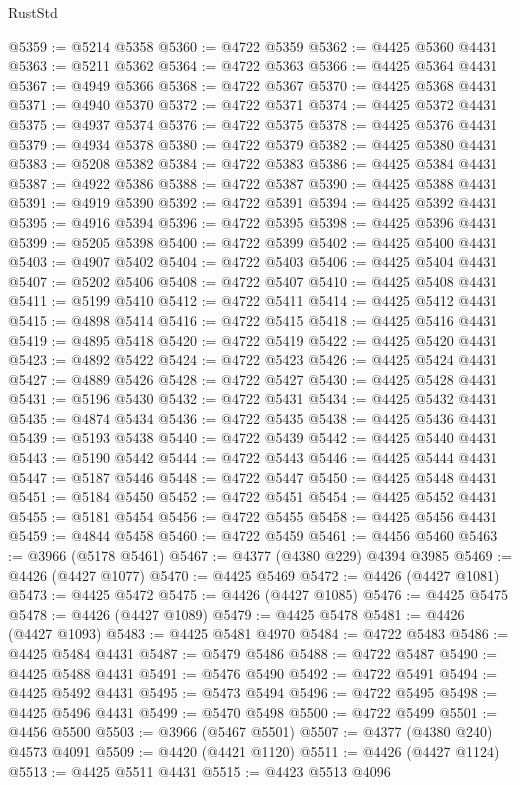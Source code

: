 \begin{lexlean}{RustStd}
\begin{coremodule}
@5359 := @5214 @5358
@5360 := @4722 @5359
@5362 := @4425 @5360 @4431
@5363 := @5211 @5362
@5364 := @4722 @5363
@5366 := @4425 @5364 @4431
@5367 := @4949 @5366
@5368 := @4722 @5367
@5370 := @4425 @5368 @4431
@5371 := @4940 @5370
@5372 := @4722 @5371
@5374 := @4425 @5372 @4431
@5375 := @4937 @5374
@5376 := @4722 @5375
@5378 := @4425 @5376 @4431
@5379 := @4934 @5378
@5380 := @4722 @5379
@5382 := @4425 @5380 @4431
@5383 := @5208 @5382
@5384 := @4722 @5383
@5386 := @4425 @5384 @4431
@5387 := @4922 @5386
@5388 := @4722 @5387
@5390 := @4425 @5388 @4431
@5391 := @4919 @5390
@5392 := @4722 @5391
@5394 := @4425 @5392 @4431
@5395 := @4916 @5394
@5396 := @4722 @5395
@5398 := @4425 @5396 @4431
@5399 := @5205 @5398
@5400 := @4722 @5399
@5402 := @4425 @5400 @4431
@5403 := @4907 @5402
@5404 := @4722 @5403
@5406 := @4425 @5404 @4431
@5407 := @5202 @5406
@5408 := @4722 @5407
@5410 := @4425 @5408 @4431
@5411 := @5199 @5410
@5412 := @4722 @5411
@5414 := @4425 @5412 @4431
@5415 := @4898 @5414
@5416 := @4722 @5415
@5418 := @4425 @5416 @4431
@5419 := @4895 @5418
@5420 := @4722 @5419
@5422 := @4425 @5420 @4431
@5423 := @4892 @5422
@5424 := @4722 @5423
@5426 := @4425 @5424 @4431
@5427 := @4889 @5426
@5428 := @4722 @5427
@5430 := @4425 @5428 @4431
@5431 := @5196 @5430
@5432 := @4722 @5431
@5434 := @4425 @5432 @4431
@5435 := @4874 @5434
@5436 := @4722 @5435
@5438 := @4425 @5436 @4431
@5439 := @5193 @5438
@5440 := @4722 @5439
@5442 := @4425 @5440 @4431
@5443 := @5190 @5442
@5444 := @4722 @5443
@5446 := @4425 @5444 @4431
@5447 := @5187 @5446
@5448 := @4722 @5447
@5450 := @4425 @5448 @4431
@5451 := @5184 @5450
@5452 := @4722 @5451
@5454 := @4425 @5452 @4431
@5455 := @5181 @5454
@5456 := @4722 @5455
@5458 := @4425 @5456 @4431
@5459 := @4844 @5458
@5460 := @4722 @5459
@5461 := @4456 @5460
@5463 := @3966 (@5178 @5461)
@5467 := @4377 (@4380 @229) @4394 @3985
@5469 := @4426 (@4427 @1077)
@5470 := @4425 @5469
@5472 := @4426 (@4427 @1081)
@5473 := @4425 @5472
@5475 := @4426 (@4427 @1085)
@5476 := @4425 @5475
@5478 := @4426 (@4427 @1089)
@5479 := @4425 @5478
@5481 := @4426 (@4427 @1093)
@5483 := @4425 @5481 @4970
@5484 := @4722 @5483
@5486 := @4425 @5484 @4431
@5487 := @5479 @5486
@5488 := @4722 @5487
@5490 := @4425 @5488 @4431
@5491 := @5476 @5490
@5492 := @4722 @5491
@5494 := @4425 @5492 @4431
@5495 := @5473 @5494
@5496 := @4722 @5495
@5498 := @4425 @5496 @4431
@5499 := @5470 @5498
@5500 := @4722 @5499
@5501 := @4456 @5500
@5503 := @3966 (@5467 @5501)
@5507 := @4377 (@4380 @240) @4573 @4091
@5509 := @4420 (@4421 @1120)
@5511 := @4426 (@4427 @1124)
@5513 := @4425 @5511 @4431
@5515 := @4423 @5513 @4096

\end{coremodule}
\end{lexlean}
